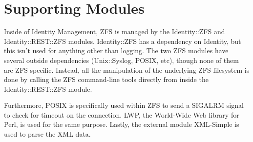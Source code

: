 \section{Supporting Modules}

Inside of Identity Management, ZFS is managed by the Identity::ZFS and Identity::REST::ZFS modules. Identity::ZFS has a dependency on Identity, but this isn't used for anything other than logging. The two ZFS modules have several outside dependencies (Unix::Syslog, POSIX, etc), though none of them are ZFS-specific. Instead, all the manipulation of the underlying ZFS filesystem is done by calling the ZFS command-line tools directly from inside the Identity::REST::ZFS module.

Furthermore, POSIX is specifically used within ZFS to send a SIGALRM signal to check for timeout on the connection. LWP, the World-Wide Web library for Perl, is used for the same purpose. Lastly, the external module XML-Simple is used to parse the XML data. 

